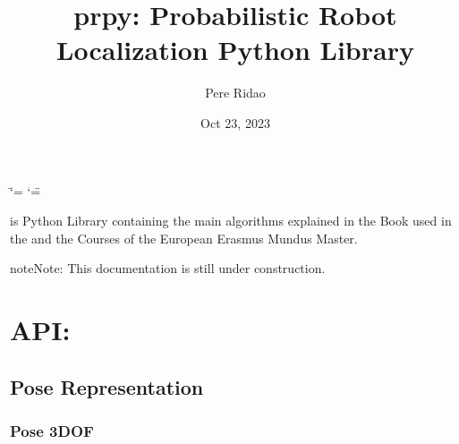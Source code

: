 \documentclass[letterpaper,10pt,english]{sphinxmanual}
\title{prpy: Probabilistic Robot Localization Python Library}
\date{Oct 23, 2023}
\author{Pere Ridao}
\begin{document}
\ifdefined\shorthandoff
  \ifnum\catcode`\=\string=\active\shorthandoff{=}\fi
  \ifnum\catcode`\"=\active{}\fi
\fi

\pagestyle{empty}
\sphinxmaketitle
\pagestyle{plain}
\sphinxtableofcontents
\pagestyle{normal}
\label{\detokenize{index::doc}}


\sphinxAtStartPar
{} is Python Library containing the main algorithms explained in the  Book used in the  and the  Courses of the  European Erasmus Mundus Master.

\begin{sphinxadmonition}{note}{Note:}
\sphinxAtStartPar
This documentation is still under construction.
\end{sphinxadmonition}


\chapter{API:}
\label{\detokenize{index:api}}
\sphinxstepscope


\section{Pose Representation}
\label{\detokenize{compounding:pose-representation}}\label{\detokenize{compounding::doc}}

\subsection{Pose 3DOF}
\label{\detokenize{compounding:pose-3dof}}
\begin{figure}[htbp]
\centering

\noindent{}
\end{figure}
\end{document}
